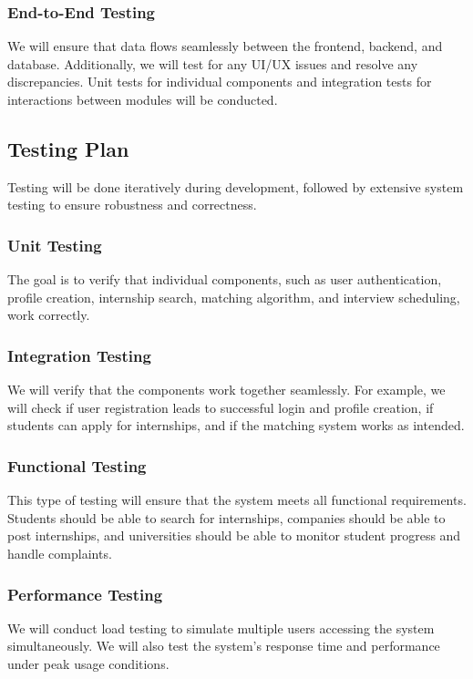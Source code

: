 \subsubsection{End-to-End Testing}
We will ensure that data flows seamlessly between the frontend, backend, and database. Additionally, we will test for any UI/UX issues and resolve any discrepancies. Unit tests for individual components and integration tests for interactions between modules will be conducted.

\subsection{Testing Plan}

Testing will be done iteratively during development, followed by extensive system testing to ensure robustness and correctness.

\subsubsection{Unit Testing}
The goal is to verify that individual components, such as user authentication, profile creation, internship search, matching algorithm, and interview scheduling, work correctly.

\subsubsection{Integration Testing}
We will verify that the components work together seamlessly. For example, we will check if user registration leads to successful login and profile creation, if students can apply for internships, and if the matching system works as intended.

\subsubsection{Functional Testing}
This type of testing will ensure that the system meets all functional requirements. Students should be able to search for internships, companies should be able to post internships, and universities should be able to monitor student progress and handle complaints.

\subsubsection{Performance Testing}
We will conduct load testing to simulate multiple users accessing the system simultaneously. We will also test the system’s response time and performance under peak usage conditions.

